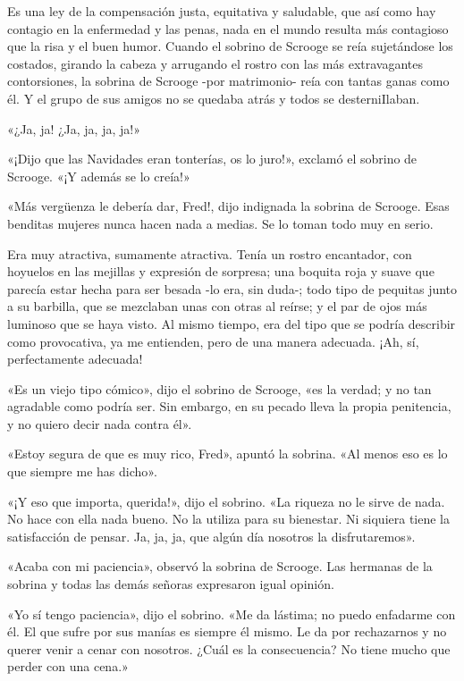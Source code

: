 \documentclass{novela}
\begin{document}
 Es una ley de la compensación justa, equitativa y saludable, que así como hay contagio en la enfermedad y las penas, nada en el mundo resulta más contagioso que la risa y el buen humor. Cuando el sobrino de Scrooge se reía sujetándose los costados, girando la cabeza y arrugando el rostro con las más extravagantes contorsiones, la sobrina de Scrooge -por matrimonio- reía con tantas ganas como él. Y el grupo de sus amigos no se quedaba atrás y todos se desterniIlaban.

 «¿Ja, ja! ¿Ja, ja, ja, ja!»

 «¡Dijo que las Navidades eran tonterías, os lo juro!», exclamó el sobrino de Scrooge. «¡Y además se lo creía!»

 «Más vergüenza le debería dar, Fred!, dijo indignada la sobrina de Scrooge. Esas benditas mujeres nunca hacen nada a medias. Se lo toman todo muy en serio.

 Era muy atractiva, sumamente atractiva. Tenía un rostro encantador, con hoyuelos en las mejillas y expresión de sorpresa; una boquita roja y suave que parecía estar hecha para ser besada -lo era, sin duda-; todo tipo de pequitas junto a su barbilla, que se mezclaban unas con otras al reírse; y el par de ojos más luminoso que se haya visto. Al mismo tiempo, era del tipo que se podría describir como provocativa, ya me entienden, pero de una manera adecuada. ¡Ah, sí, perfectamente adecuada!

 «Es un viejo tipo cómico», dijo el sobrino de Scrooge, «es la verdad; y no tan agradable como podría ser. Sin embargo, en su pecado lleva la propia penitencia, y no quiero decir nada contra él».

 «Estoy segura de que es muy rico, Fred», apuntó la sobrina. «Al menos eso es lo que siempre me has dicho».

 «¡Y eso que importa, querida!», dijo el sobrino. «La riqueza no le sirve de nada. No hace con ella nada bueno. No la utiliza para su bienestar. Ni siquiera tiene la satisfacción de pensar. Ja, ja, ja, que algún día nosotros la disfrutaremos».

 «Acaba con mi paciencia», observó la sobrina de Scrooge. Las hermanas de la sobrina y todas las demás señoras expresaron igual opinión.

 «Yo sí tengo paciencia», dijo el sobrino. «Me da lástima; no puedo enfadarme con él. El que sufre por sus manías es siempre él mismo. Le da por rechazarnos y no querer venir a cenar con nosotros. ¿Cuál es la consecuencia? No tiene mucho que perder con una cena.»
\end{document}
